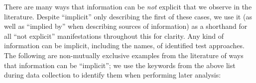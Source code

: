 There are many ways that
information can be \emph{not} explicit that we observe in the literature.
Despite ``implicit'' only describing the first of these cases, we use it
(as well as ``implied by'' when describing sources of information) as a
shorthand for all ``not explicit'' manifestations throughout this \docType{}
for clarity. Any kind of information can be implicit,
including the names, \approachFields{} of identified test approaches. The
following are non-mutually exclusive
examples from the literature of ways that information can be ``implicit'';
we use the keywords from the above list during data collection to identify
them when performing later analysis: %


